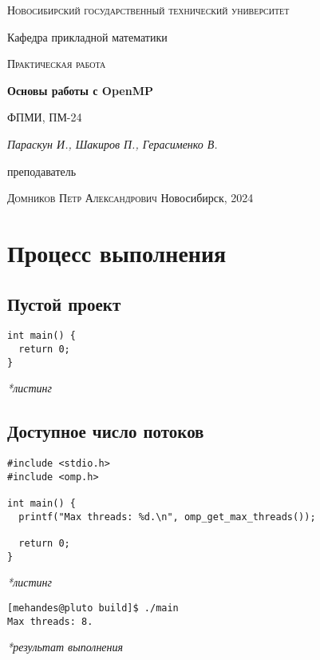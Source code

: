 \documentclass[12pt, a4paper]{article}
\begin{document}
\begin{titlepage}
  \centering
  \textsc{Новосибирский государственный технический университет}\par
  \vspace{1mm}
  Кафедра прикладной математики\par
  \vspace{4cm}
  \textsc{Практическая работа }\par
  {\huge\bfseries Основы работы с OpenMP\par}
  \vspace{1cm}
  {\scriptsize ФПМИ, ПМ-24\par}
  \vspace{1mm}
  {\itshape\large Параскун И., Шакиров П., Герасименко В.\par}
  \vfill
  {\small преподаватель\par}
  \vspace{1mm}
  \textsc{Домников Петр Александрович}
  \vfill
  \large{Новосибирск, 2024}
\end{titlepage}

\newpage

\section{Процесс выполнения}
\subsection{Пустой проект}

\begin{verbatim}
int main() {
  return 0;
}
\end{verbatim}
\textit{*листинг}

\subsection{Доступное число потоков}

\begin{verbatim}
#include <stdio.h>
#include <omp.h>

int main() {
  printf("Max threads: %d.\n", omp_get_max_threads());

  return 0;
}
\end{verbatim}
\textit{*листинг}

\begin{verbatim}
[mehandes@pluto build]$ ./main
Max threads: 8.
\end{verbatim}
\textit{*результат выполнения}
\end{document}
